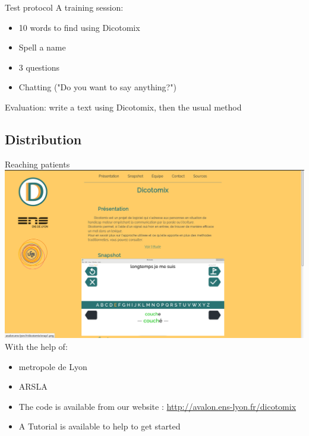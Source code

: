 \documentclass[graphics]{beamer}
\begin{document}
\begin{frame}{Test protocol}
	A training session:
	\begin{itemize}
		\item 10 words to find using Dicotomix
		\item Spell a name
		\item 3 questions
		\item Chatting ("Do you want to say anything?")
	\end{itemize}
	Evaluation: write a text using Dicotomix, then the usual method
\end{frame}

\subsection{Distribution}
\begin{frame}{Reaching patients}
	\hspace{7cm}
	\includegraphics[scale=0.075]{website}\\
	With the help of:
	\begin{itemize}
		\item metropole de Lyon
		\item ARSLA
		\item The code is available from our website : \hyperref[http://avalon.ens-lyon.fr/dicotomix]{http://avalon.ens-lyon.fr/dicotomix}
		\item A Tutorial is available to help to get started
	\end{itemize}
	\hspace{10cm}

\end{frame}
\end{document}
